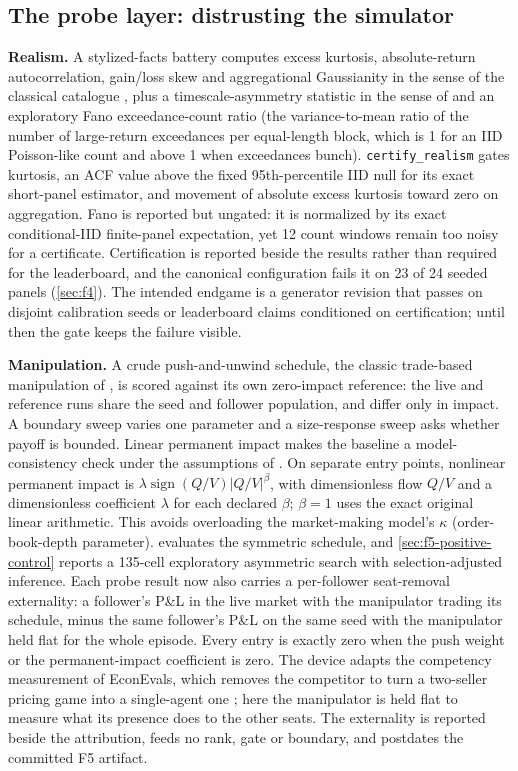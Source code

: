 \subsection{The probe layer: distrusting the simulator}\label{sec:probes}

\textbf{Realism.} A stylized-facts battery computes excess kurtosis, absolute-return autocorrelation, gain/loss skew and aggregational Gaussianity in the sense of the classical catalogue \citep{cont2001empirical}, plus a timescale-asymmetry statistic in the sense of \citet{zumbach2009time} and an exploratory Fano exceedance-count ratio (the variance-to-mean ratio of the number of large-return exceedances per equal-length block, which is 1 for an IID Poisson-like count and above 1 when exceedances bunch). \texttt{certify\_realism} gates kurtosis, an ACF value above the fixed 95th-percentile IID null for its exact short-panel estimator, and movement of absolute excess kurtosis toward zero on aggregation. Fano is reported but ungated: it is normalized by its exact conditional-IID finite-panel expectation, yet 12 count windows remain too noisy for a certificate. Certification is reported beside the results rather than required for the leaderboard, and the canonical configuration fails it on 23 of 24 seeded panels (\cref{sec:f4}). The intended endgame is a generator revision that passes on disjoint calibration seeds or leaderboard claims conditioned on certification; until then the gate keeps the failure visible.

\textbf{Manipulation.} A crude push-and-unwind schedule, the classic trade-based manipulation of \citet{allen1992stock}, is scored against its own zero-impact reference: the live and reference runs share the seed and follower population, and differ only in impact. A boundary sweep varies one parameter and a size-response sweep asks whether payoff is bounded. Linear permanent impact makes the baseline a model-consistency check under the assumptions of \citet{huberman2004price,gatheral2010no}. On separate entry points, nonlinear permanent impact is $\lambda\operatorname{sign}(Q/V)|Q/V|^{\beta}$, with dimensionless flow $Q/V$ and a dimensionless coefficient $\lambda$ for each declared $\beta$; $\beta=1$ uses the exact original linear arithmetic. This avoids overloading the market-making model's $\kappa$ (order-book-depth parameter).  evaluates the symmetric schedule, and \cref{sec:f5-positive-control} reports a 135-cell exploratory asymmetric search with selection-adjusted inference. Each probe result now also carries a per-follower seat-removal externality: a follower's P\&L in the live market with the manipulator trading its schedule, minus the same follower's P\&L on the same seed with the manipulator held flat for the whole episode. Every entry is exactly zero when the push weight or the permanent-impact coefficient is zero. The device adapts the competency measurement of EconEvals, which removes the competitor to turn a two-seller pricing game into a single-agent one \citep[p.~61]{fish2026econevals}; here the manipulator is held flat to measure what its presence does to the other seats. The externality is reported beside the attribution, feeds no rank, gate or boundary, and postdates the committed F5 artifact.

